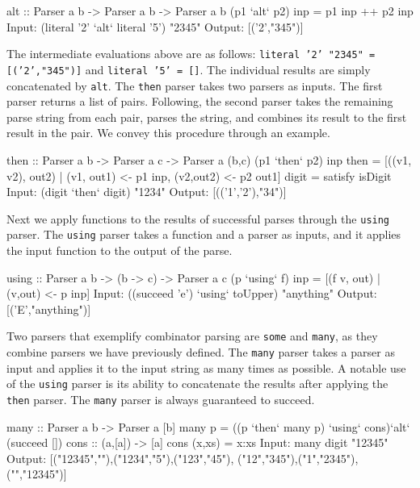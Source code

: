 \documentclass[11pt]{article}
\begin{document}
\hspace{2cm}\begin{verbbox}
alt :: Parser a b -> Parser a b -> Parser a b
(p1 `alt` p2) inp = p1 inp ++ p2 inp
Input:  (literal '2' `alt` literal '5') "2345" 
Output: [('2',"345")]
\end{verbbox}
\theverbbox

The intermediate evaluations above are as follows: \texttt{literal '2' "2345" = [('2',"345")]} and \texttt{literal '5' = []}. The individual results are simply concatenated by \texttt{alt}. The \texttt{then} parser takes two parsers as inputs. The first parser returns a list of pairs. Following, the second parser takes the remaining parse string from each pair, parses the string, and combines its result to the first result in the pair. We convey this procedure through an example.

\hspace{2cm}\begin{verbbox}
then :: Parser a b -> Parser a c -> Parser a (b,c) (p1 `then` p2) inp 
then = [((v1, v2), out2) | (v1, out1) <- p1 inp, (v2,out2) <- p2 out1]
digit = satisfy isDigit
Input:  (digit `then` digit) "1234"
Output: [(('1','2'),"34")]
\end{verbbox}
\theverbbox

Next we apply functions to the results of successful parses through the \texttt{using} parser. The \texttt{using} parser takes a function and a parser as inputs, and it applies the input function to the output of the parse.

\hspace{2cm}\begin{verbbox}
using :: Parser a b -> (b -> c) -> Parser a c 
(p `using` f) inp = [(f v, out) | (v,out) <- p inp] 
Input:  ((succeed 'e') `using` toUpper) "anything" 
Output: [('E',"anything")]
\end{verbbox}
\theverbbox

Two parsers that exemplify combinator parsing are \texttt{some} and \texttt{many}, as they combine parsers we have previously defined. The \texttt{many} parser takes a parser as input and applies it to the input string as many times as possible. A notable use of the \texttt{using} parser is its ability to concatenate the results after applying the \texttt{then} parser. The \texttt{many} parser is always guaranteed to succeed.

\hspace{2cm}\begin{verbbox}
many :: Parser a b -> Parser a [b] 
many p = ((p `then` many p) `using` cons)`alt` (succeed []) 
cons :: (a,[a]) -> [a] 
cons (x,xs) = x:xs
Input:  many digit "12345" 
Output: [("12345",""),("1234","5"),("123","45"),
         ("12","345"),("1","2345"),("","12345")]
\end{verbbox}
\theverbbox
\end{document}
